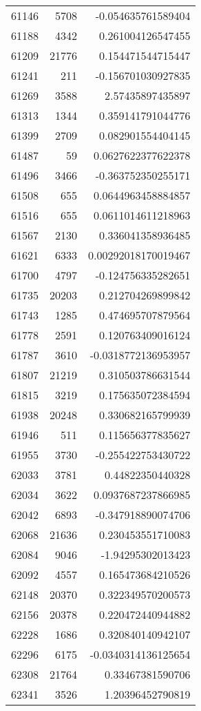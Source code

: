 \begin{tabular}{r | r | r}
61146 & 5708 & -0.054635761589404 \\
61188 & 4342 & 0.261004126547455 \\
61209 & 21776 & 0.154471544715447 \\
61241 & 211 & -0.156701030927835 \\
61269 & 3588 & 2.57435897435897 \\
61313 & 1344 & 0.359141791044776 \\
61399 & 2709 & 0.082901554404145 \\
61487 & 59 & 0.0627622377622378 \\
61496 & 3466 & -0.363752350255171 \\
61508 & 655 & 0.0644963458884857 \\
61516 & 655 & 0.0611014611218963 \\
61567 & 2130 & 0.336041358936485 \\
61621 & 6333 & 0.00292018170019467 \\
61700 & 4797 & -0.124756335282651 \\
61735 & 20203 & 0.212704269899842 \\
61743 & 1285 & 0.474695707879564 \\
61778 & 2591 & 0.120763409016124 \\
61787 & 3610 & -0.0318772136953957 \\
61807 & 21219 & 0.310503786631544 \\
61815 & 3219 & 0.175635072384594 \\
61938 & 20248 & 0.330682165799939 \\
61946 & 511 & 0.115656377835627 \\
61955 & 3730 & -0.255422753430722 \\
62033 & 3781 & 0.44822350440328 \\
62034 & 3622 & 0.0937687237866985 \\
62042 & 6893 & -0.347918890074706 \\
62068 & 21636 & 0.230453551710083 \\
62084 & 9046 & -1.94295302013423 \\
62092 & 4557 & 0.165473684210526 \\
62148 & 20370 & 0.322349570200573 \\
62156 & 20378 & 0.220472440944882 \\
62228 & 1686 & 0.320840140942107 \\
62296 & 6175 & -0.0340314136125654 \\
62308 & 21764 & 0.33467381590706 \\
62341 & 3526 & 1.20396452790819 \\

\end{tabular}
